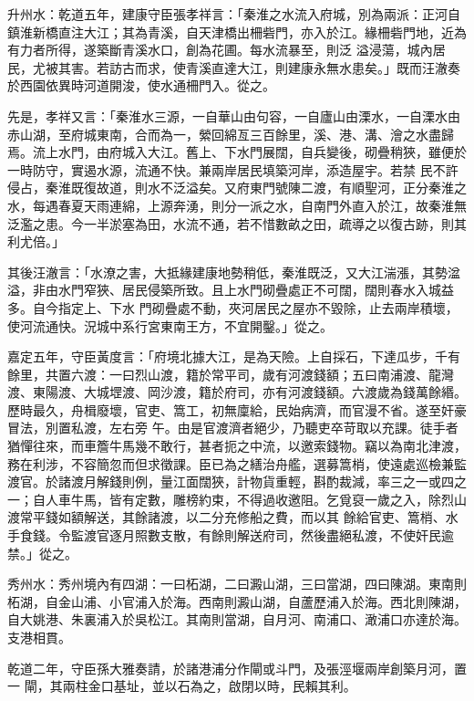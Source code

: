 \begin{pinyinscope}
 升州水：乾道五年，建康守臣張孝祥言：「秦淮之水流入府城，別為兩派：正河自鎮淮新橋直注大江；其為青溪，自天津橋出柵砦門，亦入於江。緣柵砦門地，近為有力者所得，遂築斷青溪水口，創為花圃。每水流暴至，則泛
 溢浸蕩，城內居民，尤被其害。若訪古而求，使青溪直達大江，則建康永無水患矣。」既而汪澈奏於西園依異時河道開浚，使水通柵門入。從之。



 先是，孝祥又言：「秦淮水三源，一自華山由句容，一自廬山由溧水，一自溧水由赤山湖，至府城東南，合而為一，縈回綿亙三百餘里，溪、港、溝、澮之水盡歸焉。流上水門，由府城入大江。舊上、下水門展闊，自兵變後，砌疊稍狹，雖便於一時防守，實遏水源，流通不快。兼兩岸居民填築河岸，添造屋宇。若禁
 民不許侵占，秦淮既復故道，則水不泛溢矣。又府東門號陳二渡，有順聖河，正分秦淮之水，每遇春夏天雨連綿，上源奔湧，則分一派之水，自南門外直入於江，故秦淮無泛濫之患。今一半淤塞為田，水流不通，若不惜數畝之田，疏導之以復古跡，則其利尤倍。」



 其後汪澈言：「水潦之害，大抵緣建康地勢稍低，秦淮既泛，又大江湍漲，其勢湓溢，非由水門窄狹、居民侵築所致。且上水門砌疊處正不可闊，闊則春水入城益多。自今指定上、下水
 門砌疊處不動，夾河居民之屋亦不毀除，止去兩岸積壞，使河流通快。況城中系行宮東南王方，不宜開鑿。」從之。



 嘉定五年，守臣黃度言：「府境北據大江，是為天險。上自採石，下達瓜步，千有餘里，共置六渡：一曰烈山渡，籍於常平司，歲有河渡錢額；五曰南浦渡、龍灣渡、東陽渡、大城堽渡、岡沙渡，籍於府司，亦有河渡錢額。六渡歲為錢萬餘緡。歷時最久，舟楫廢壞，官吏、篙工，初無廩給，民始病濟，而官漫不省。遂至奸豪冒法，別置私渡，左右旁
 午。由是官渡濟者絕少，乃聽吏卒苛取以充課。徒手者猶憚往來，而車簷牛馬幾不敢行，甚者扼之中流，以邀索錢物。竊以為南北津渡，務在利涉，不容簡忽而但求徵課。臣已為之繕治舟艦，選募篙梢，使遠處巡檢兼監渡官。於諸渡月解錢則例，量江面闊狹，計物貨重輕，斟酌裁減，率三之一或四之一；自人車牛馬，皆有定數，雕榜約束，不得過收邀阻。乞覓裒一歲之入，除烈山渡常平錢如額解送，其餘諸渡，以二分充修船之費，而以其
 餘給官吏、篙梢、水手食錢。令監渡官逐月照數支散，有餘則解送府司，然後盡絕私渡，不使奸民逾禁。」從之。



 秀州水：秀州境內有四湖：一曰柘湖，二曰澱山湖，三曰當湖，四曰陳湖。東南則柘湖，自金山浦、小官浦入於海。西南則澱山湖，自蘆歷浦入於海。西北則陳湖，自大姚港、朱裏浦入於吳松江。其南則當湖，自月河、南浦口、澉浦口亦達於海。支港相貫。



 乾道二年，守臣孫大雅奏請，於諸港浦分作閘或斗門，及張涇堰兩岸創築月河，置一
 閘，其兩柱金口基址，並以石為之，啟閉以時，民賴其利。




\end{pinyinscope}
